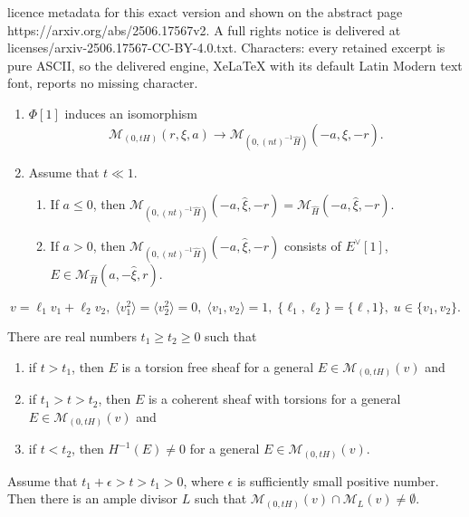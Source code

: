 \documentclass[10pt,a4paper]{amsart}
\newcommand{\cal}{\mathcal}
\begin{document}
licence metadata for this exact version and shown on the abstract page https://arxiv.org/abs/2506.17567v2. A full rights notice is delivered at licenses/arxiv-2506.17567-CC-BY-4.0.txt. Characters: every retained excerpt is pure ASCII, so the delivered engine, XeLaTeX with its default Latin Modern text font, reports no missing character.
\begin{prop}\label{prop:isom}
\begin{enumerate}
\item[(1)]
$\Phi[1]$ induces an isomorphism
$$
{\cal M}_{(0,tH)}(r,\xi,a) \to {\cal M}_{(0,(nt)^{-1} \widehat{H})}(-a,\widehat{\xi},-r).
$$
\item[(2)]
Assume that $t \ll 1$.
\begin{enumerate}
\item
If $a \leq 0$, then
${\cal M}_{(0,(nt)^{-1} \widehat{H})}(-a,\widehat{\xi},-r)={\cal M}_{\widehat{H}}(-a,\widehat{\xi},-r)$.
\item
If $a>0$, then
${\cal M}_{(0,(nt)^{-1} \widehat{H})}(-a,\widehat{\xi},-r)$ 
consists of $E^{\vee}[1]$, $E \in {\cal M}_{\widehat{H}}(a,-\widehat{\xi},r)$.
\end{enumerate}
\end{enumerate}
\end{prop}

\begin{equation}\label{eq:u}
v=\ell_1 v_1+\ell_2 v_2, \; \langle v_1^2 \rangle=\langle v_2^2 \rangle=0,\; 
\langle v_1,v_2 \rangle=1,\; \{ \ell_1,\ell_2 \}=\{ \ell,1 \},\; u \in \{v_1,v_2 \}. 
\end{equation}

\begin{prop}\label{prop:t_0}
There are real numbers $t_1 \geq t_2 \geq 0$ such that
\begin{enumerate}
\item
if $t>t_1$, then 
$E$ is a torsion free sheaf for a general $E \in {\cal M}_{(0,tH)}(v)$ and
\item
if $t_1>t>t_2$, then
$E$ is a coherent sheaf with torsions for a general
$E \in {\cal M}_{(0,tH)}(v)$ and
\item
if $t<t_2$, then
 $H^{-1}(E) \ne 0$ for a general $E \in {\cal M}_{(0,tH)}(v)$.
\end{enumerate}
\end{prop}

\begin{lem}\label{lem:Gieseker}
Assume that $t_1+\epsilon>t>t_1>0$, where $\epsilon$ is sufficiently small positive number.
Then there is an ample divisor $L$ such that
${\cal M}_{(0,tH)}(v) \cap {\cal M}_{L}(v) \ne \emptyset$.
\end{lem}
\end{document}
